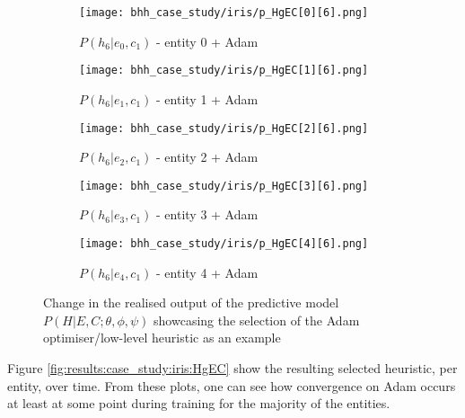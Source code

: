 \begin{figure}[htbp]
	\begin{subfigure}{0.5\textwidth}
		\centering
		\texttt{[image: bhh\_case\_study/iris/p\_HgEC[0][6].png]}
		\caption{$P\left(h_{6}|e_{0},c_{1}\right)$ - entity 0 + \Acs{Adam} }
		\label{fig:results:case_study:iris:p_HgEC:0:6}
	\end{subfigure}
	\begin{subfigure}{0.5\textwidth}
		\centering
		\texttt{[image: bhh\_case\_study/iris/p\_HgEC[1][6].png]}
		\caption{$P\left(h_{6}|e_{1},c_{1}\right)$ - entity 1 + \Acs{Adam} }
		\label{fig:results:case_study:iris:p_HgEC:1:6}
	\end{subfigure}
	\par\bigskip
	\begin{subfigure}{0.5\textwidth}
		\centering
		\texttt{[image: bhh\_case\_study/iris/p\_HgEC[2][6].png]}
		\caption{$P\left(h_{6}|e_{2},c_{1}\right)$ - entity 2 + \Acs{Adam} }
		\label{fig:results:case_study:iris:p_HgEC:2:6}
	\end{subfigure}
	\begin{subfigure}{0.5\textwidth}
		\centering
		\texttt{[image: bhh\_case\_study/iris/p\_HgEC[3][6].png]}
		\caption{$P\left(h_{6}|e_{3},c_{1}\right)$ - entity 3 + \Acs{Adam} }
		\label{fig:results:case_study:iris:p_HgEC:3:6}
	\end{subfigure}
	\par\bigskip
	\begin{subfigure}{\textwidth}
		\centering
		\texttt{[image: bhh\_case\_study/iris/p\_HgEC[4][6].png]}
		\caption{$P\left(h_{6}|e_{4},c_{1}\right)$ - entity 4 + \Acs{Adam} }
		\label{fig:results:case_study:iris:p_HgEC:4:6}
	\end{subfigure}
	\par\bigskip
	\caption{Change in the realised output of the predictive model $P\left(H|E,C;\theta,\phi,\psi \right)$ showcasing the selection of the \Acs{Adam} optimiser/low-level heuristic as an example}
	\label{fig:results:case_study:iris:p_HgEC}
\end{figure}

Figure \ref{fig:results:case_study:iris:HgEC} show the resulting selected heuristic, per entity, over time. From these plots, one can see how convergence on \Acs{Adam} occurs at least at some point during training for the majority of the entities.


